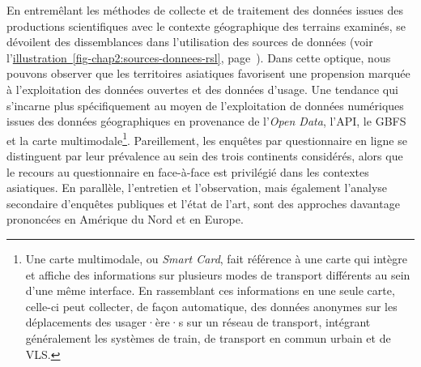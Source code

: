 \begin{refsegment}
En entremêlant les méthodes de collecte et de traitement des données issues des productions scientifiques avec le contexte géographique des terrains examinés, se dévoilent des dissemblances dans l'utilisation des sources de données (voir l'\hyperref[fig-chap2:sources-donnees-rsl]{illustration~\ref{fig-chap2:sources-donnees-rsl}}, page~\pageref{fig-chap2:sources-donnees-rsl}). Dans cette optique, nous pouvons observer que les territoires asiatiques favorisent une propension marquée à l'exploitation des données ouvertes et des données d'usage. Une tendance qui s'incarne plus spécifiquement au moyen de l'exploitation de données numériques issues des données géographiques en provenance de l'\textsl{Open Data}, l'\acrshort{API}, le \acrshort{GBFS} et la carte multimodale\footnote{
    Une carte multimodale, ou \textsl{Smart Card}, fait référence à une carte qui intègre et affiche des informations sur plusieurs modes de transport différents au sein d'une même interface. En rassemblant ces informations en une seule carte, celle-ci peut collecter, de façon automatique, des données anonymes sur les déplacements des usager·ère·s sur un réseau de transport, intégrant généralement les systèmes de train, de transport en commun urbain et de \acrshort{VLS}.
}. Pareillement, les enquêtes par questionnaire en ligne se distinguent par leur prévalence au sein des trois continents considérés, alors que le recours au questionnaire en face-à-face est privilégié dans les contextes asiatiques. En parallèle, l'entretien et l'observation, mais également l'analyse secondaire d'enquêtes publiques et l'état de l'art, sont des approches davantage prononcées en Amérique du Nord et en Europe.%


\end{refsegment}
